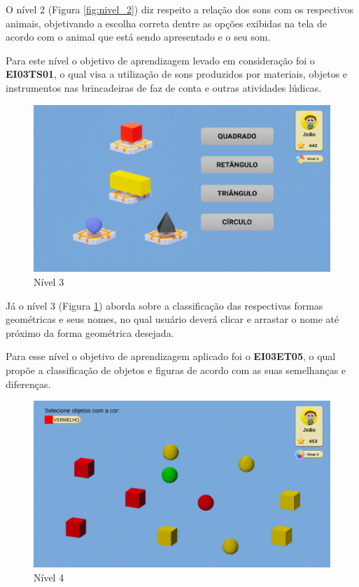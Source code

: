 \documentclass[article,12pt,openany,oneside,a4paper,english,brazil]{abntex2}
\begin{document}
O nível 2 (Figura \ref{fig:nivel_2}) diz respeito a relação dos sons com os respectivos animais, objetivando a escolha correta dentre as opções exibidas na tela de acordo com o animal que está sendo apresentado e o seu som.

Para este nível o objetivo de aprendizagem levado em consideração foi o \textbf{EI03TS01}, o qual visa a utilização de sons produzidos por materiais, objetos e instrumentos nas brincadeiras de faz de conta e outras atividades lúdicas.

\begin{figure}[H]
    \centering
    \caption{Nível 3}
    \label{fig:nivel_3}
    \includegraphics[width=0.8\linewidth]{GameScreenshots/Level3.png}
\end{figure}

Já o nível 3 (Figura \ref{fig:nivel_3}) aborda sobre a classificação das respectivas formas geométricas e seus nomes, no qual usuário deverá clicar e arrastar o nome até próximo da forma geométrica desejada.

Para esse nível o objetivo de aprendizagem aplicado foi o \textbf{EI03ET05}, o qual propõe a classificação de objetos e figuras de acordo com as suas semelhanças e diferenças.

\begin{figure}[H]
    \centering
    \caption{Nível 4}
    \label{fig:nivel_4}
    \includegraphics[width=0.8\linewidth]{GameScreenshots/Level4.png}
\end{figure}
\end{document}
